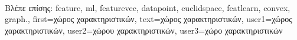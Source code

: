 {{%
		\\
		\foreignlanguage{greek}{Βλέπε επίσης:} \gls{feature}, \gls{ml}, \gls{featurevec}, \gls{datapoint}, \gls{euclidspace}, 
		\gls{featlearn}, \gls{convex}, \gls{graph}.},
	first={\foreignlanguage{greek}{χώρος χαρακτηριστικών}},
	text={\foreignlanguage{greek}{χώρος χαρακτηριστικών}},
	user1={\foreignlanguage{greek}{χώρος χαρακτηριστικών}}, %
  	user2={\foreignlanguage{greek}{χώρου χαρακτηριστικών}}, %
	user3={\foreignlanguage{greek}{χώρο χαρακτηριστικών}} %
}

